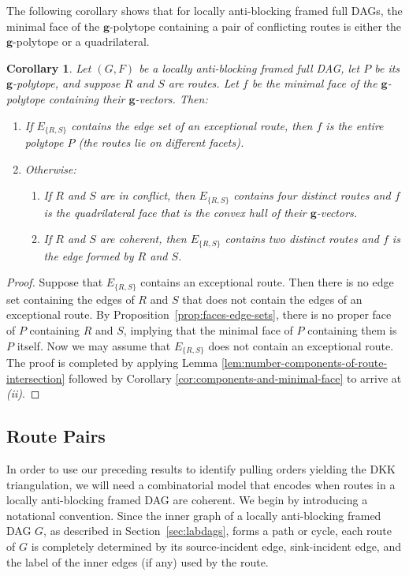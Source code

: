\documentclass[12pt]{amsart}
\newtheorem{corollary}[theorem]{Corollary}
\theoremstyle{definition}
\newcommand\bg{\mathbf{g}}
\begin{document}
The following corollary shows that for locally anti-blocking framed full DAGs, the minimal face of the $\bg$-polytope containing a pair of conflicting routes is either the $\bg$-polytope or a quadrilateral.

\begin{corollary}\label{cor:incoherence-square}
    Let $(G,F)$ be a locally anti-blocking framed full DAG, let $P$ be its $\bg$-polytope, and suppose $R$ and $S$ are routes.
    Let $f$ be the minimal face of the $\bg$-polytope containing their $\bg$-vectors. 
    Then:
    \begin{enumerate}
    [label=(\roman*)]
        \item If $E_{\{R,S\}}$ contains the edge set of an exceptional route, then $f$ is the entire polytope $P$ (the routes lie on different facets).
        \item Otherwise:
        \begin{enumerate}
        \item If $R$ and $S$ are in conflict, then $E_{\{R,S\}}$ contains four distinct routes and $f$ is the quadrilateral face that is the convex hull of their $\bg$-vectors.
        \item If $R$ and $S$ are coherent, then $E_{\{R,S\}}$ contains two distinct routes and $f$ is the edge formed by $R$ and $S$.
        \end{enumerate}
    \end{enumerate}
\end{corollary}

\begin{proof}
    Suppose that $E_{\{R,S\}}$ contains an exceptional route. Then there is no edge set containing the edges of $R$ and $S$ that does not contain the edges of an exceptional route. By Proposition~\ref{prop:faces-edge-sets}, there is no proper face of $P$ containing $R$ and $S$, implying that the minimal face of $P$ containing them is $P$ itself.
    Now we may assume that $E_{\{R,S\}}$ does not contain an exceptional route. The proof is completed by applying Lemma \ref{lem:number-components-of-route-intersection} followed by Corollary \ref{cor:components-and-minimal-face} to arrive at \textit{(ii)}.
\end{proof}

\subsection{Route Pairs}\label{sec:routepairs} 

In order to use our preceding results to identify pulling orders yielding the DKK triangulation, we will need a combinatorial model that encodes when routes in a locally anti-blocking framed DAG are coherent.
We begin by introducing a notational convention.
Since the inner graph of a locally anti-blocking framed DAG $G$, as described in Section~\ref{sec:labdags}, forms a path or cycle, each route of $G$ is completely determined by its source-incident edge, sink-incident edge, and the label of the inner edges (if any) used by the route.
\end{document}
